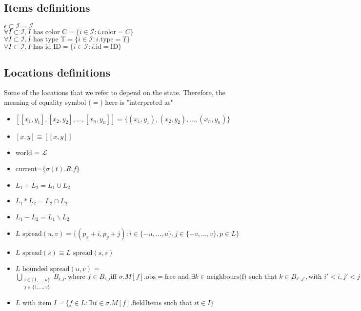 \documentclass{article}
\begin{document}
\subsection*{Items definitions}
$\epsilon \subset \mathcal{I} = \mathcal{I}$\\
$\forall I \subset \mathcal{I}, I \text{ has color C} = \{ i \in \mathcal{I}: i.\text{color}=C \}$\\
$\forall I \subset \mathcal{I}, I \text{ has type T} = \{ i \in \mathcal{I}: i.\text{type}=T \}$\\
$\forall I \subset \mathcal{I}, I \text{ has id ID} = \{ i \in \mathcal{I}: i.\text{id}=\text{ID} \}$

\subsection*{Locations definitions}
Some of the locations that we refer to depend on the state. Therefore, the meaning of equality symbol ($=$) here is "interpreted as"\\
\begin{itemize}
\item $[[ x_1, y_1 ],[ x_2, y_2 ], \ldots, [ x_n, y_n]] = \{(x_1, y_1), (x_2, y_2), \ldots, (x_n, y_n) \}$
\item $[x,y] \equiv [[x,y]]$
\item world = $\mathcal{L}$
\item current=$\{ \sigma(t).R.f\}$
\item $L_1 + L_2 = L_1 \cup L_2$
\item $L_1 * L_2 = L_2 \cap L_2$
\item $L_1 - L_2 = L_1 \backslash L_2$
\item $L \text{ spread}(u, v) = \{ (p_x+i, p_y+j): i \in \{-u, \ldots, u \}, j \in \{-v, \ldots, v \}, p \in L \}$
\item $L \text{ spread}(s) \equiv L \text{ spread}(s,s)$
\item $L \text{ bounded spread}(u,v)$ = $\bigcup\limits_{\substack{i \in \{1,\ldots, u\} \\j \in \{1, \ldots, v \}}}B_{i,j}, \text{where } f \in B_{i,j} \text{iff } \sigma.M[f].\text{obs} = \text{free } \text{and }  \exists k \in \text{neighbours(f) such that } k \in B_{i', j'},  \text{with } i' < i, j'<j$
\item $L \text{ with item } I = \{f \in L: \exists {it} \in \sigma.M[f].\text{fieldItems} \text{ such that } it \in I\}$
\end{itemize}
\end{document}
